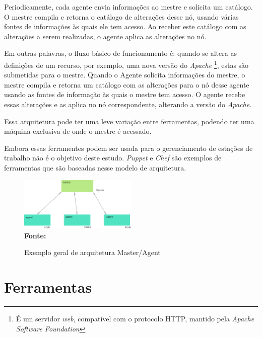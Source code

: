  Periodicamente, cada agente envia informações ao mestre e solicita um catálogo. O mestre compila e retorna o catálogo de alterações desse nó, usando várias fontes de informações às quais ele tem acesso. Ao receber este catálogo com as alterações a serem realizadas, o agente aplica as alterações no nó. 
 
 Em outras palavras, o fluxo básico de funcionamento é: quando se altera as definições de um recurso, por exemplo, uma nova versão do \textit{Apache} \footnote{É um servidor \textit{web}, compatível com o protocolo HTTP, mantido pela \textit{Apache Software Foundation }}, estas são submetidas para o mestre. Quando o Agente solicita informações do mestre, o mestre compila e retorna um catálogo com as alterações para o nó desse agente usando as fontes de informação às quais o mestre tem acesso. O agente recebe essas alterações e as aplica no nó correspondente, alterando a versão do \textit{Apache}.   

Essa arquitetura pode ter uma leve variação entre ferramentas, podendo ter uma máquina exclusiva de onde o mestre é acessado.

Embora essas ferramentes podem ser usada para o gerenciamento de estações de trabalho não é o objetivo deste estudo. 
\textit{Puppet} e \textit{Chef} são exemplos de ferramentas que são baseadas nesse modelo de arquitetura. 


 \begin{figure}[ht]
	\centering	
	\caption[\hspace{0.1cm}Exemplo arquitetura Master/Agent]{Exemplo geral de arquitetura Master/Agent}
	\vspace{-0.4cm}
	\includegraphics[width=0.5\textwidth]{figuras/master-agent.png}
	 \vspace{-0.2cm}
	\\\textbf{\footnotesize Fonte: \cite{Harit}}
	\label{fig:figura4}
\end{figure}
\vspace{-0.5cm}

\section{Ferramentas}

